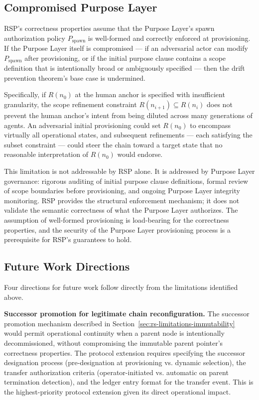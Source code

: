 \subsection{Compromised Purpose Layer}
\label{sec:rs-limitations-purpose-layer}

RSP's correctness properties assume that the Purpose Layer's spawn authorization policy $P_{\mathrm{spawn}}$ is well-formed and correctly enforced at provisioning. If the Purpose Layer itself is compromised — if an adversarial actor can modify $P_{\mathrm{spawn}}$ after provisioning, or if the initial purpose clause contains a scope definition that is intentionally broad or ambiguously specified — then the drift prevention theorem's base case is undermined.

Specifically, if $R(n_0)$ at the human anchor is specified with insufficient granularity, the scope refinement constraint $R(n_{i+1}) \subseteq R(n_i)$ does not prevent the human anchor's intent from being diluted across many generations of agents. An adversarial initial provisioning could set $R(n_0)$ to encompass virtually all operational states, and subsequent refinements — each satisfying the subset constraint — could steer the chain toward a target state that no reasonable interpretation of $R(n_0)$ would endorse.

This limitation is not addressable by RSP alone. It is addressed by Purpose Layer governance: rigorous auditing of initial purpose clause definitions, formal review of scope boundaries before provisioning, and ongoing Purpose Layer integrity monitoring. RSP provides the structural enforcement mechanism; it does not validate the semantic correctness of what the Purpose Layer authorizes. The assumption of well-formed provisioning is load-bearing for the correctness properties, and the security of the Purpose Layer provisioning process is a prerequisite for RSP's guarantees to hold.

\subsection{Future Work Directions}
\label{sec:rs-future-work}

Four directions for future work follow directly from the limitations identified above.

\medskip
\noindent\textbf{Successor promotion for legitimate chain reconfiguration.} The successor promotion mechanism described in Section~\ref{sec:rs-limitations-immutability} would permit operational continuity when a parent node is intentionally decommissioned, without compromising the immutable parent pointer's correctness properties. The protocol extension requires specifying the successor designation process (pre-designation at provisioning vs. dynamic selection), the transfer authorization criteria (operator-initiated vs. automatic on parent termination detection), and the ledger entry format for the transfer event. This is the highest-priority protocol extension given its direct operational impact.

